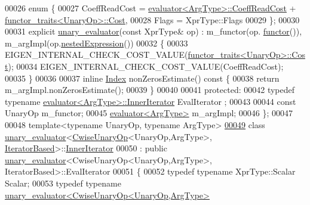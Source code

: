 \begin{DoxyCode}
00026     \textcolor{keyword}{enum} \{
00027       CoeffReadCost = \hyperlink{struct_eigen_1_1internal_1_1evaluator}{evaluator<ArgType>::CoeffReadCost} + 
      \hyperlink{struct_eigen_1_1internal_1_1functor__traits}{functor\_traits<UnaryOp>::Cost},
00028       Flags = XprType::Flags
00029     \};
00030     
00031     \textcolor{keyword}{explicit} \hyperlink{struct_eigen_1_1internal_1_1unary__evaluator}{unary\_evaluator}(\textcolor{keyword}{const} XprType& op) : m\_functor(op.
      \hyperlink{group___core___module_ac02eff03893317021760f7d093c4ab9d}{functor}()), m\_argImpl(op.\hyperlink{group___core___module_a25d4402be360cf0b8ff867863da46c7d}{nestedExpression}())
00032     \{
00033       EIGEN\_INTERNAL\_CHECK\_COST\_VALUE(\hyperlink{struct_eigen_1_1internal_1_1functor__traits}{functor\_traits<UnaryOp>::Cost});
00034       EIGEN\_INTERNAL\_CHECK\_COST\_VALUE(CoeffReadCost);
00035     \}
00036     
00037     \textcolor{keyword}{inline} \hyperlink{namespace_eigen_a62e77e0933482dafde8fe197d9a2cfde}{Index} nonZerosEstimate()\textcolor{keyword}{ const }\{
00038       \textcolor{keywordflow}{return} m\_argImpl.nonZerosEstimate();
00039     \}
00040 
00041   \textcolor{keyword}{protected}:
00042     \textcolor{keyword}{typedef} \textcolor{keyword}{typename} \hyperlink{struct_eigen_1_1internal_1_1evaluator}{evaluator<ArgType>::InnerIterator}        EvalIterator
      ;
00043     
00044     \textcolor{keyword}{const} UnaryOp m\_functor;
00045     \hyperlink{struct_eigen_1_1internal_1_1evaluator}{evaluator<ArgType>} m\_argImpl;
00046 \};
00047 
00048 \textcolor{keyword}{template}<\textcolor{keyword}{typename} UnaryOp, \textcolor{keyword}{typename} ArgType>
\hyperlink{class_eigen_1_1internal_1_1unary__evaluator_3_01_cwise_unary_op_3_01_unary_op_00_01_arg_type_01_629bdbe0b310981fdaf6bb6b6c73ef55}{00049} \textcolor{keyword}{class }\hyperlink{struct_eigen_1_1internal_1_1unary__evaluator}{unary\_evaluator}<\hyperlink{group___core___module_class_eigen_1_1_cwise_unary_op}{CwiseUnaryOp}<UnaryOp,ArgType>, 
      \hyperlink{struct_eigen_1_1internal_1_1_iterator_based}{IteratorBased}>::\hyperlink{class_eigen_1_1_inner_iterator}{InnerIterator}
00050     : \textcolor{keyword}{public} \hyperlink{struct_eigen_1_1internal_1_1unary__evaluator}{unary\_evaluator}<CwiseUnaryOp<UnaryOp,ArgType>, IteratorBased>::EvalIterator
00051 \{
00052     \textcolor{keyword}{typedef} \textcolor{keyword}{typename} XprType::Scalar Scalar;
00053     \textcolor{keyword}{typedef} \textcolor{keyword}{typename} \hyperlink{struct_eigen_1_1internal_1_1unary__evaluator}{unary\_evaluator<CwiseUnaryOp<UnaryOp,ArgType>}

\end{DoxyCode}
